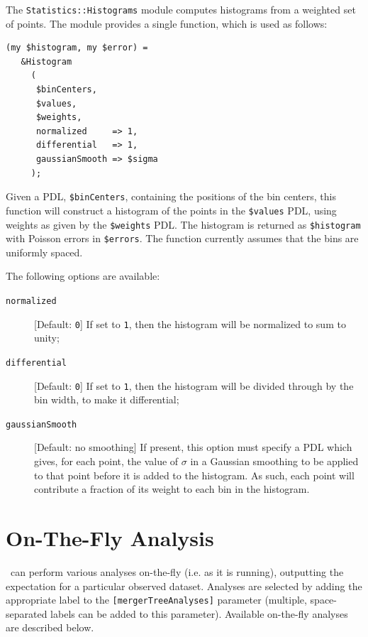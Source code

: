 The {\tt Statistics::Histograms} module computes histograms from a weighted set of points. The module provides a single function, which is used as follows:
\begin{verbatim}
(my $histogram, my $error) = 
   &Histogram
     (
      $binCenters,
      $values,
      $weights,
      normalized     => 1,
      differential   => 1,
      gaussianSmooth => $sigma
     );
\end{verbatim}
Given a PDL, {\tt \$binCenters}, containing the positions of the bin centers, this function will construct a histogram of the points in the {\tt \$values} PDL, using weights as given by the {\tt \$weights} PDL. The histogram is returned as {\tt \$histogram} with Poisson errors in {\tt \$errors}. The function currently assumes that the bins are uniformly spaced.

The following options are available:
\begin{description}
 \item [{\tt normalized}] [Default: {\tt 0}] If set to {\tt 1}, then the histogram will be normalized to sum to unity;
 \item [{\tt differential}] [Default: {\tt 0}] If set to {\tt 1}, then the histogram will be divided through by the bin width, to make it differential;
 \item[{\tt gaussianSmooth}] [Default: no smoothing] If present, this option must specify a PDL which gives, for each point, the value of $\sigma$ in a Gaussian smoothing to be applied to that point before it is added to the histogram. As such, each point will contribute a fraction of its weight to each bin in the histogram.
\end{description}

\section{On-The-Fly Analysis}\label{sec:OnTheFlyAnalysis}

\glc\ can perform various analyses on-the-fly (i.e. as it is running), outputting the expectation for a particular observed dataset. Analyses are selected by adding the appropriate label to the {\tt [mergerTreeAnalyses]} parameter (multiple, space-separated labels can be added to this parameter). Available on-the-fly analyses are described below.

